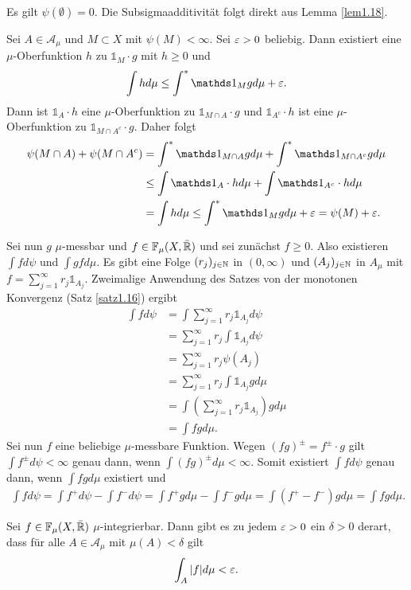 \documentclass[a4paper,twoside,DIV15,BCOR12mm]{scrbook}
\newcommand{\A}{\mathcal A}
\newcommand{\ind}{\mathds 1}
\begin{document}
\begin{beweis}
Es gilt $\psi(\emptyset)=0$. Die Subsigmaadditivität folgt direkt aus Lemma \ref{lem1.18}.

Sei $A\in\A_\mu$ und $M\subset X$ mit $\psi(M)<\infty$. Sei $\varepsilon>0$ beliebig. Dann existiert eine $\mu$-Oberfunktion $h$ zu $\ind_M\cdot g$ mit $h\ge 0$ und
\[
\int h d\mu \le \int^* \ind_M g d \mu + \ep.
\]
Dann ist $\ind_A\cdot h$ eine $\mu$-Oberfunktion zu $\ind_{M\cap A}\cdot g$ und $\ind_{A^c}\cdot h$ ist eine $\mu$-Oberfunktion zu $\ind_{M\cap A^c}\cdot g$. Daher folgt
\begin{align*}
\psi(M\cap A)+\psi(M\cap A^c)
&= \int^* \ind_{M\cap A} gd\mu + \int^* \ind_{M\cap A^c} gd\mu \\
&\le \int \ind_A \cdot h d\mu + \int \ind_{A^c} \cdot h d\mu \\
&= \int h d\mu \le \int^* \ind_M g d\mu + \ep = \psi(M) + \ep.
\end{align*}

Sei nun $g$ $\mu$-messbar und $f\in \mathbb F_\mu(X,\bar{\mathbb{R}})$ und sei zunächst $f\ge 0$. Also existieren $\int fd\psi$ und $\int gfd\mu$. Es gibt eine Folge $(r_j)_{j\in\mathbb{N}}$ in $(0,\infty)$ und $(A_j)_{j\in\mathbb{N}}$ in $A_\mu$ mit $f = \sum_{j=1}^\infty r_j\ind_{A_j}$. Zweimalige Anwendung des 
Satzes von der monotonen Konvergenz (Satz \ref{satz1.16}) ergibt 
\begin{align*}
\int fd\psi 
&= \int \sum_{j=1}^\infty r_j \ind_{A_j} d\psi \\
&= \sum_{j=1}^\infty r_j \int \ind_{A_j} d\psi \\
&= \sum_{j=1}^\infty r_j \psi(A_j) \\
&= \sum_{j=1}^\infty r_j \int \ind_{A_j} gd\mu \\
&= \int \left( \sum_{j=1}^\infty r_j \ind_{A_j}\right) g d\mu \\
&= \int fgd\mu.
\end{align*}
Sei nun $f$ eine beliebige $\mu$-messbare Funktion. Wegen $(fg)^\pm = f^\pm \cdot g$ gilt $\int f^\pm d\psi < \infty$ genau dann, wenn $\int (f g)^{\pm} d\mu<\infty$. Somit existiert $\int f d\psi$ genau dann, wenn $\int fg d\mu$ existiert und
\begin{multline*}
\int fd\psi = \int f^+ d\psi - \int f^- d\psi = \int f^+gd\mu - \int f^-gd\mu = \int (f^+ - f^-)g d\mu = \int fgd\mu.
\end{multline*}
\end{beweis}

\begin{satz}
Sei $f\in \mathbb F_\mu(X,\bar{\mathbb{R}})$ $\mu$-integrierbar. Dann gibt es zu jedem $\varepsilon >0$ ein $\delta > 0$ derart, dass für alle $A\in \A_\mu$ mit $\mu(A)<\delta$ gilt
\[
\int_A |f|d\mu <\varepsilon.
\]
\end{satz}
\end{document}
